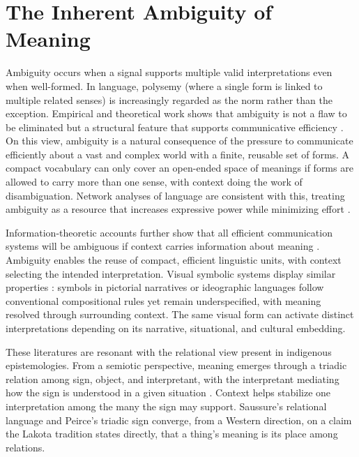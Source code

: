\documentclass[final,creativeai]{article}
\begin{document}
\section{The Inherent Ambiguity of Meaning}
Ambiguity occurs when a signal supports multiple valid interpretations even when well-formed. In language, polysemy (where a single form is linked to multiple related senses) is increasingly regarded as the norm rather than the exception. Empirical and theoretical work shows that ambiguity is not a flaw to be eliminated but a structural feature that supports communicative efficiency \citep{piantadosi_communicative_2012, hermalin_efficient_2019}. On this view, ambiguity is a natural consequence of the pressure to communicate efficiently about a vast and complex world with a finite, reusable set of forms. A compact vocabulary can only cover an open-ended space of meanings if forms are allowed to carry more than one sense, with context doing the work of disambiguation. Network analyses of language are consistent with this, treating ambiguity as a resource that increases expressive power while minimizing effort \citep{sole_ambiguity_2015}.

Information-theoretic accounts further show that all efficient communication systems will be ambiguous if context carries information about meaning \citep{piantadosi_communicative_2012}. Ambiguity enables the reuse of compact, efficient linguistic units, with context selecting the intended interpretation. Visual symbolic systems display similar properties \citep{cohn_visual_2013}: symbols in pictorial narratives or ideographic languages follow conventional compositional rules yet remain underspecified, with meaning resolved through surrounding context. The same visual form can activate distinct interpretations depending on its narrative, situational, and cultural embedding.

These literatures are resonant with the relational view present in indigenous epistemologies. From a semiotic perspective, meaning emerges through a triadic relation among sign, object, and interpretant, with the interpretant mediating how the sign is understood in a given situation \citep{kilstrup_naturalizing_2015, smythe_formal_1998, innis_semiotics_1985}. Context helps stabilize one interpretation among the many the sign may support. Saussure's relational language and Peirce's triadic sign converge, from a Western direction, on a claim the Lakota tradition states directly, that a thing's meaning is its place among relations.
\end{document}
